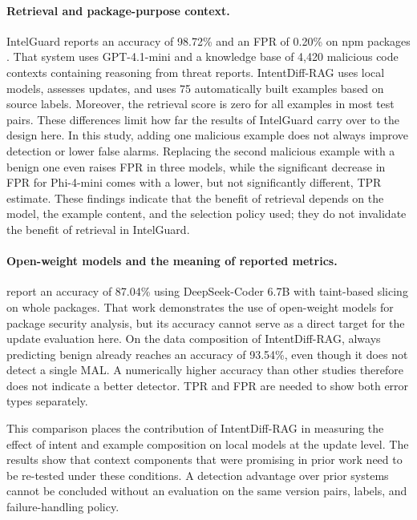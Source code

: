 \documentclass[a4paper,fleqn]{cas-dc}
\begin{document}
\paragraph{Retrieval and package-purpose context.}
IntelGuard reports an accuracy of 98.72\% and an FPR of 0.20\% on npm packages
\citep{guo2026bridging}. That system uses GPT-4.1-mini and a knowledge base of
4,420 malicious code contexts containing reasoning from threat reports.
IntentDiff-RAG uses local models, assesses updates, and uses 75 automatically
built examples based on source labels. Moreover, the retrieval score is zero for
all examples in most test pairs. These differences limit how far the results of
IntelGuard carry over to the design here. In this study, adding one malicious
example does not always improve detection or lower false alarms. Replacing the
second malicious example with a benign one even raises FPR in three models, while
the significant decrease in FPR for Phi-4-mini comes with a lower, but not
significantly different, TPR estimate. These findings
indicate that the benefit of retrieval depends on the model, the example content,
and the selection policy used; they do not invalidate the benefit of retrieval in
IntelGuard.

\paragraph{Open-weight models and the meaning of reported metrics.}
\citet{nguyen2025taint} report an accuracy of 87.04\% using DeepSeek-Coder 6.7B
with taint-based slicing on whole packages. That work demonstrates the use of
open-weight models for package security analysis, but its accuracy cannot serve
as a direct target for the update evaluation here. On the data composition of
IntentDiff-RAG, always predicting benign already reaches an accuracy of 93.54\%,
even though it does not detect a single MAL. A numerically higher accuracy than
other studies therefore does not indicate a better detector. TPR and FPR are
needed to show both error types separately.

This comparison places the contribution of IntentDiff-RAG in measuring the effect
of intent and example composition on local models at the update level. The results
show that context components that were promising in prior work need to be
re-tested under these conditions. A detection advantage over prior systems cannot
be concluded without an evaluation on the same version pairs, labels, and
failure-handling policy.
\end{document}
